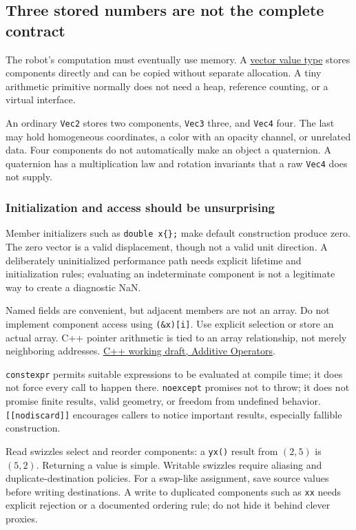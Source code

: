 \subsection{Three stored numbers are not the complete contract}\label{three-stored-numbers-are-not-the-complete-contract}

The robot's computation must eventually use memory. A \hyperref[02-foundations-ii-ch037]{vector value type} stores components directly and can be copied without separate allocation. A tiny arithmetic primitive normally does not need a heap, reference counting, or a virtual interface.

An ordinary \texttt{Vec2} stores two components, \texttt{Vec3} three, and \texttt{Vec4} four. The last may hold homogeneous coordinates, a color with an opacity channel, or unrelated data. Four components do not automatically make an object a quaternion. A quaternion has a multiplication law and rotation invariants that a raw \texttt{Vec4} does not supply.

\subsubsection{Initialization and access should be unsurprising}\label{initialization-and-access-should-be-unsurprising}

Member initializers such as \texttt{double\ x\{\};} make default construction produce zero. The zero vector is a valid displacement, though not a valid unit direction. A deliberately uninitialized performance path needs explicit lifetime and initialization rules; evaluating an indeterminate component is not a legitimate way to create a diagnostic NaN.

Named fields are convenient, but adjacent members are not an array. Do not implement component access using \texttt{(\&x){[}i{]}}. Use explicit selection or store an actual array. C++ pointer arithmetic is tied to an array relationship, not merely neighboring addresses. \href{https://eel.is/c++draft/expr.add}{C++ working draft, Additive Operators}.

\texttt{constexpr} permits suitable expressions to be evaluated at compile time; it does not force every call to happen there. \texttt{noexcept} promises not to throw; it does not promise finite results, valid geometry, or freedom from undefined behavior. \texttt{{[}{[}nodiscard{]}{]}} encourages callers to notice important results, especially fallible construction.

Read swizzles select and reorder components: a \texttt{yx()} result from \((2,5)\) is \((5,2)\). Returning a value is simple. Writable swizzles require aliasing and duplicate-destination policies. For a swap-like assignment, save source values before writing destinations. A write to duplicated components such as \texttt{xx} needs explicit rejection or a documented ordering rule; do not hide it behind clever proxies.

